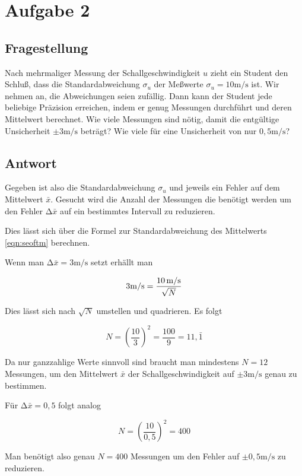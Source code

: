 \section{Aufgabe 2}

\subsection{Fragestellung}
Nach mehrmaliger Messung der Schallgeschwindigkeit $u$ zieht ein Student den
Schluß, dass die Standardabweichung $\sigma_u$ der Meßwerte $\sigma_u = 10 \si{\meter\per\second}$ ist. Wir nehmen
an, die Abweichungen seien zufällig. Dann kann der Student jede beliebige
Präzision erreichen, indem er genug Messungen durchführt und deren Mittelwert
berechnet. Wie viele Messungen sind nötig, damit die entgültige Unsicherheit
$\pm 3 \si{\meter\per\second}$ beträgt? Wie viele für eine Unsicherheit von nur $0{,}5 \si{\meter\per\second}$?

\subsection{Antwort}

Gegeben ist also die Standardabweichung $\sigma_u$ und jeweils ein Fehler auf dem Mittelwert $\bar{x}$.
Gesucht wird die Anzahl der Messungen die benötigt werden um den Fehler $\increment\bar{x}$ auf ein bestimmtes Intervall zu reduzieren.

\begin{flushleft}
Dies lässt sich über die Formel zur Standardabweichung des Mittelwerts \eqref{eqn:seoftm} berechnen.

Wenn man $\increment\bar{x} = 3 \si{\meter\per\second}$ setzt erhällt man
\end{flushleft}
\begin{equation}
3\si[per-mode=symbol]{\meter\per\second} = \frac{\SI{10}{\meter\per\second}}{\sqrt{N}}
\end{equation}

\begin{flushleft}
Dies lässt sich nach $\sqrt{N}$ umstellen und quadrieren. Es folgt
\end{flushleft}
\begin{equation}
N = \left( \frac{10}{3} \right)^2 = \frac{100}{9} = 11{,}\bar{1}
\end{equation}

\begin{flushleft}
Da nur ganzzahlige Werte sinnvoll sind braucht man mindestens $N = 12$ Messungen, um 
den Mittelwert $\bar{x}$ der Schallgeschwindigkeit auf $\pm 3 \si{\meter\per\second}$ genau zu bestimmen.

Für $\increment\bar{x} = 0{,}5$ folgt analog
\end{flushleft}
\begin{equation}
N = \left( \frac{10}{0{,}5} \right)^2 = 400
\end{equation}

\begin{flushleft}
Man benötigt also genau $N = 400$ Messungen um den Fehler auf $\pm 0{,}5 \si{\meter\per\second}$ zu reduzieren. 
\end{flushleft}